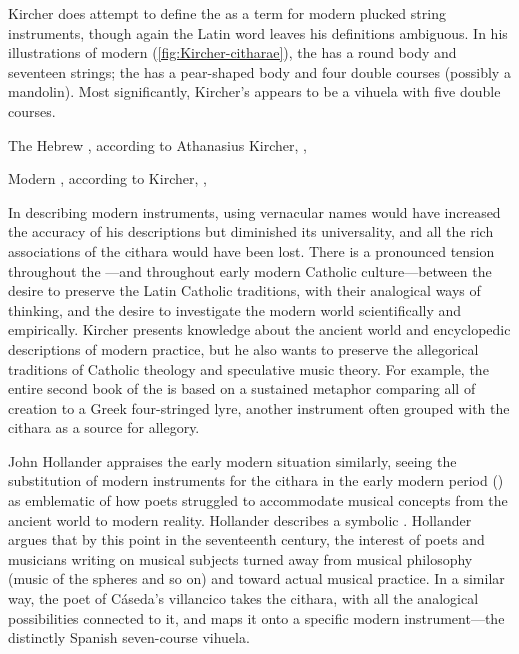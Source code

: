 Kircher does attempt to define the  as a term for modern
plucked string instruments, though again the Latin word leaves his definitions
ambiguous.
In his illustrations of modern  (\cref{fig:Kircher-citharae}),
the  has a round body and seventeen strings; the
 has a pear-shaped body and four double
courses (possibly a mandolin).
Most significantly, Kircher's  appears to be a vihuela
with five double courses.

{The Hebrew , according to Athanasius Kircher, , }

{Modern , according to Kircher, ,
}

In describing modern instruments, using vernacular names would have increased
the accuracy of his descriptions but diminished its universality, and all the
rich associations of the cithara would have been lost.
There is a pronounced tension throughout the ---and throughout
early modern Catholic culture---between the desire to preserve the Latin
Catholic traditions, with their analogical ways of thinking, and the desire to
investigate the modern world scientifically and empirically.
Kircher presents  knowledge about the ancient world and
encyclopedic descriptions of modern practice, but he also wants to preserve the
allegorical traditions of Catholic theology and speculative music theory.
For example, the entire second book of the  is based on a
sustained metaphor comparing all of creation to a Greek four-stringed lyre,
another instrument often grouped with the cithara as a source for allegory.

John Hollander appraises the early modern situation similarly, seeing the
substitution of modern instruments for the cithara in the early modern period
() as emblematic of how poets struggled to accommodate
musical concepts from the ancient world to modern reality.
Hollander describes a symbolic .%
    \Autocite[44--51]{Hollander:Untuning}
Hollander argues that by this point in the seventeenth century, the interest of
poets and musicians writing on musical subjects turned away from musical
philosophy (music of the spheres and so on) and toward actual musical practice. 
In a similar way, the poet of Cáseda's villancico takes the cithara, with all
the analogical possibilities connected to it, and maps it onto a specific
modern instrument---the distinctly Spanish seven-course vihuela.

